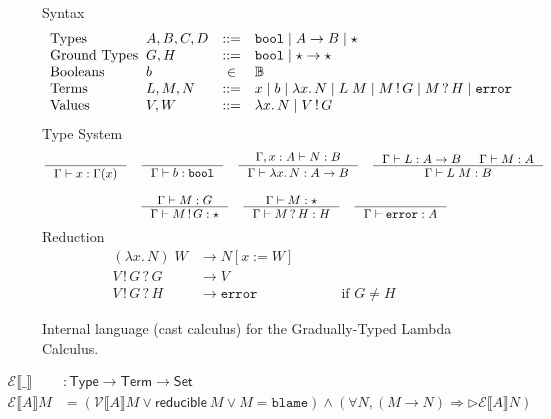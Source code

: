 \documentclass[acmsmall]{acmart}
\makeatletter
\newcommand{\sem}[1]{\llbracket #1 \rrbracket}
\newcommand{\semV}[1]{\mathcal{V}\sem{#1}}
\newcommand{\semE}[1]{\mathcal{E}\sem{#1}}
\newcommand{\ba}{\begin{array}}
\newcommand{\ea}{\end{array}}
\newenvironment{syntax}{\[\ba{l@{\;\;}lcl}}{\ea\]}
\newcommand{\dotspace}{.\,}
\newcommand{\key}[1]{\ensuremath{\mathtt{#1}}}
\newcommand{\dyn}{\star}
\newcommand{\Bool}{\key{bool}}
\newcommand{\lam}[1]{\lambda #1 \dotspace}
\newcommand{\app}{\;}
\newcommand{\reduce}{\longrightarrow}
\newcommand{\inj}[2]{#1 \,!\, #2}
\newcommand{\proj}[2]{#1 \,?\, #2}
\makeatother
\begin{document}
\begin{figure}
  \raggedright Syntax
  \begin{syntax}
    \text{Types} & A,B,C,D &::=& \Bool \mid A \to B \mid \dyn \\
    \text{Ground Types} & G,H & ::= & \mathtt{bool} \mid \dyn \to \dyn \\
    \text{Booleans} & b & \in & \mathbb{B} \\
    \text{Terms} & L,M,N & ::= & x \mid b \mid \lam{x}N \mid L \app M
      \mid \inj{M}{G} \mid \proj{M}{H} \mid \mathtt{error} \\
      \text{Values} & V,W & ::= & \lam{x}N \mid \inj{V}{G}
  \end{syntax}
  Type System
  \begin{gather*}
    \inference{}{\Gamma \vdash x : \Gamma(x)}
    \quad
    \inference{}{\Gamma \vdash b : \Bool}
    \quad
    \inference{\Gamma, x : A \vdash N : B}
              {\Gamma \vdash \lam{x} N : A \to B}
    \quad              
    \inference{\Gamma \vdash L : A \to B & \Gamma \vdash M : A}
          {\Gamma \vdash L \app M : B} \\[2ex]
   \inference{\Gamma \vdash M : G}
          {\Gamma \vdash \inj{M}{G} : \dyn}
   \quad
   \inference{\Gamma \vdash M : \dyn}
             {\Gamma \vdash \proj{M}{H} : H}
   \quad
   \inference{}
             {\Gamma \vdash \mathtt{error} : A}
  \end{gather*}
Reduction
\begin{align*}
  (\lam{x} N)\app W & \reduce N[x:=W] \\
  \proj{\inj{V}{G}}{G} & \reduce V \\
  \proj{\inj{V}{G}}{H} & \reduce \texttt{error}
       \qquad\qquad\qquad\text{if } G \neq H 
\end{align*}

  \caption{Internal language (cast calculus) for the Gradually-Typed
    Lambda Calculus.}
  \label{fig:CC}
\end{figure}

\begin{align*}
    \semE{\_} &: \mathsf{Type} \to \mathsf{Term} \to \mathsf{Set} \\
    \semE{A} M &= (\semV{A} M \lor \mathsf{reducible}\ M \lor M=\mathtt{blame})
                \land (\forall N, (M \reduce N) \Rightarrow \rhd \semE{A} N)
\end{align*}



\end{document}
